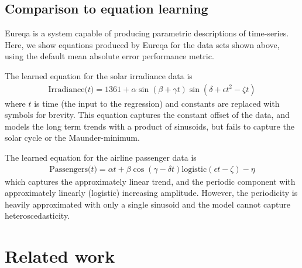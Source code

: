 \documentclass[letterpaper]{article}
\newcommand{\procedurename}{ABCD}
\begin{document}
\subsection{Comparison to equation learning}
\label{sec:eqn-learning-comp}


Eureqa \citep{Eureqa} is a system capable of producing parametric descriptions of time-series.
Here, we show equations produced by Eureqa for the data sets shown above, using the default mean absolute error performance metric.


The learned equation for the solar irradiance data is
\begin{align*}
\textrm{Irradiance($t$)} = 1361 + \alpha\sin(\beta + \gamma t)\sin(\delta + \epsilon t^2 - \zeta t)
\end{align*}
where $t$ is time (the input to the regression) and constants are replaced with symbols for brevity.
This equation captures the constant offset of the data, and models the long term trends with a product of sinusoids, but fails to capture the solar cycle or the Maunder-minimum.

The learned equation for the airline passenger data is
\begin{align*}
\textrm{Passengers($t$)} = \alpha t + \beta\cos(\gamma - \delta t)\textrm{logistic}(\epsilon t - \zeta) - \eta
\end{align*}
which captures the approximately linear trend, and the periodic component with approximately linearly (logistic) increasing amplitude.
However, the periodicity is heavily approximated with only a single sinusoid and the model cannot capture heteroscedasticity.





\section{Related work}
\label{sec:related-work}
\end{document}
